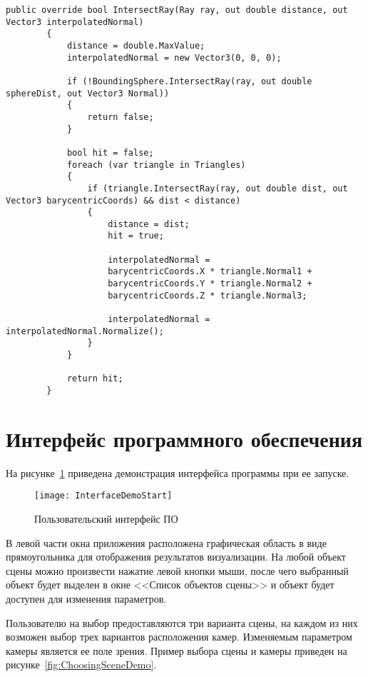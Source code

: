 \begin{center}
	\begin{lstlisting}[label={lst:ChessIntersection}, captionpos={b}, caption={Алгоритм поиска точки пересечения луча с шахматной фигурой}]
		public override bool IntersectRay(Ray ray, out double distance, out Vector3 interpolatedNormal)
		{
			distance = double.MaxValue;
			interpolatedNormal = new Vector3(0, 0, 0);
			
			if (!BoundingSphere.IntersectRay(ray, out double sphereDist, out Vector3 Normal))
			{
				return false;
			}
			
			bool hit = false;
			foreach (var triangle in Triangles)
			{
				if (triangle.IntersectRay(ray, out double dist, out Vector3 barycentricCoords) && dist < distance)
				{
					distance = dist;
					hit = true;
					
					interpolatedNormal =
					barycentricCoords.X * triangle.Normal1 +
					barycentricCoords.Y * triangle.Normal2 +
					barycentricCoords.Z * triangle.Normal3;
					
					interpolatedNormal = interpolatedNormal.Normalize();
				}
			}
			
			return hit;
		}
	\end{lstlisting}
\end{center}

\section{Интерфейс программного обеспечения}
На рисунке~\ref{fig:InterfaceDemoStart} приведена демонстрация интерфейса программы при ее запуске.
\begin{figure}[H]
	\centering
	\texttt{[image: InterfaceDemoStart]}
	\caption{Пользовательский интерфейс ПО}
	\label{fig:InterfaceDemoStart}
\end{figure}

В левой части окна приложения расположена графическая область в виде прямоугольника для отображения результатов визуализации. На любой объект сцены можно произвести нажатие левой кнопки мыши, после чего выбранный объект будет выделен в окне <<Список объектов сцены>> и объект будет доступен для изменения параметров.

Пользователю на выбор предоставляются три варианта сцены, на каждом из них возможен выбор трех вариантов расположения камер. Изменяемым параметром камеры является ее поле зрения. Пример выбора сцены и камеры приведен на рисунке~\ref{fig:ChoosingSceneDemo}.


